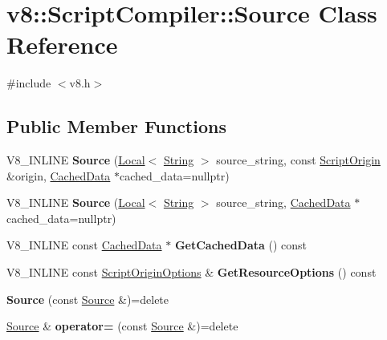 \hypertarget{classv8_1_1ScriptCompiler_1_1Source}{}\section{v8\+:\+:Script\+Compiler\+:\+:Source Class Reference}
\label{classv8_1_1ScriptCompiler_1_1Source}


{\ttfamily \#include $<$v8.\+h$>$}

\subsection*{Public Member Functions}
\begin{DoxyCompactItemize}
\item 
\mbox{\label{classv8_1_1ScriptCompiler_1_1Source_a502cbffac379870d7a1c1d8a5bd2a3cb}} 
V8\+\_\+\+I\+N\+L\+I\+NE {\bfseries Source} (\mbox{\hyperlink{classv8_1_1Local}{Local}}$<$ \mbox{\hyperlink{classv8_1_1String}{String}} $>$ source\+\_\+string, const \mbox{\hyperlink{classv8_1_1ScriptOrigin}{Script\+Origin}} \&origin, \mbox{\hyperlink{structv8_1_1ScriptCompiler_1_1CachedData}{Cached\+Data}} $\ast$cached\+\_\+data=nullptr)
\item 
\mbox{\label{classv8_1_1ScriptCompiler_1_1Source_ad6c29914f21222d70408e28aa1f09a03}} 
V8\+\_\+\+I\+N\+L\+I\+NE {\bfseries Source} (\mbox{\hyperlink{classv8_1_1Local}{Local}}$<$ \mbox{\hyperlink{classv8_1_1String}{String}} $>$ source\+\_\+string, \mbox{\hyperlink{structv8_1_1ScriptCompiler_1_1CachedData}{Cached\+Data}} $\ast$cached\+\_\+data=nullptr)
\item 
\mbox{\label{classv8_1_1ScriptCompiler_1_1Source_aa3c0706b728864348e2ffed3d8171e13}} 
V8\+\_\+\+I\+N\+L\+I\+NE const \mbox{\hyperlink{structv8_1_1ScriptCompiler_1_1CachedData}{Cached\+Data}} $\ast$ {\bfseries Get\+Cached\+Data} () const
\item 
\mbox{\label{classv8_1_1ScriptCompiler_1_1Source_add86f8a29146eb28f6f9609e946f354b}} 
V8\+\_\+\+I\+N\+L\+I\+NE const \mbox{\hyperlink{classv8_1_1ScriptOriginOptions}{Script\+Origin\+Options}} \& {\bfseries Get\+Resource\+Options} () const
\item 
\mbox{\label{classv8_1_1ScriptCompiler_1_1Source_a3dd172320a0954c69f8f609a7ea34d5e}} 
{\bfseries Source} (const \mbox{\hyperlink{classv8_1_1ScriptCompiler_1_1Source}{Source}} \&)=delete
\item 
\mbox{\label{classv8_1_1ScriptCompiler_1_1Source_ad9bd0550f7b3a33a8ef9e739eccdcb3a}} 
\mbox{\hyperlink{classv8_1_1ScriptCompiler_1_1Source}{Source}} \& {\bfseries operator=} (const \mbox{\hyperlink{classv8_1_1ScriptCompiler_1_1Source}{Source}} \&)=delete
\end{DoxyCompactItemize}
